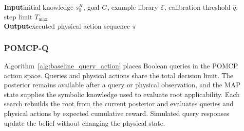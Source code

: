 \begin{algorithm}[H]
\caption{IntroPlan}
\label{alg:baseline_introplan}
\textbf{Input}\quad initial knowledge $s_0^{K}$, goal $G$, example library $\mathcal{E}$, calibration threshold $\hat q$, step limit $T_{\max}$\\
\textbf{Output}\quad executed physical action sequence $\pi$
\BlankLine
{}
\end{algorithm}

\subsubsection{POMCP-Q}
Algorithm~\ref{alg:baseline_query_action} places Boolean queries in the POMCP action space. Queries and physical actions share the total decision limit. The posterior remains available after a query or physical observation, and the MAP state supplies the symbolic knowledge used to evaluate root applicability. Each search rebuilds the root from the current posterior and evaluates queries and physical actions by expected cumulative reward. Simulated query responses update the belief without changing the physical state.

